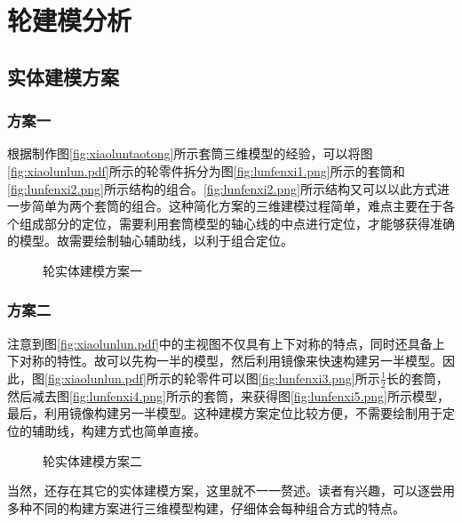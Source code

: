 \section{轮建模分析}
\subsection{实体建模方案}
\subsubsection{方案一}
根据制作图\ref{fig:xiaoluntaotong}所示套筒三维模型的经验，可以将图\ref{fig:xiaolunlun.pdf}所示的轮零件拆分为图\ref{fig:lunfenxi1.png}所示的套筒和\ref{fig:lunfenxi2.png}所示结构的组合。\ref{fig:lunfenxi2.png}所示结构又可以以此方式进一步简单为两个套筒的组合。这种简化方案的三维建模过程简单，难点主要在于各个组成部分的定位，需要利用套筒模型的轴心线的中点进行定位，才能够获得准确的模型。故需要绘制轴心辅助线，以利于组合定位。
\begin{figure}[htbp]
\centering
{}\hspace{20pt}
\caption{轮实体建模方案一}
\end{figure}
\subsubsection{方案二}

注意到图\ref{fig:xiaolunlun.pdf}中的主视图不仅具有上下对称的特点，同时还具备上下对称的特性。故可以先构一半的模型，然后利用镜像来快速构建另一半模型。因此，图\ref{fig:xiaolunlun.pdf}所示的轮零件可以图\ref{fig:lunfenxi3.png}所示$\frac{1}{2}$长的套筒，然后减去图\ref{fig:lunfenxi4.png}所示的套筒，来获得图\ref{fig:lunfenxi5.png}所示模型，最后，利用镜像构建另一半模型。这种建模方案定位比较方便，不需要绘制用于定位的辅助线，构建方式也简单直接。
\begin{figure}[htbp]
\centering
{}\hspace{20pt}
\hspace{20pt}
\caption{轮实体建模方案二}
\end{figure}

当然，还存在其它的实体建模方案，这里就不一一赘述。读者有兴趣，可以逐尝用多种不同的构建方案进行三维模型构建，仔细体会每种组合方式的特点。
